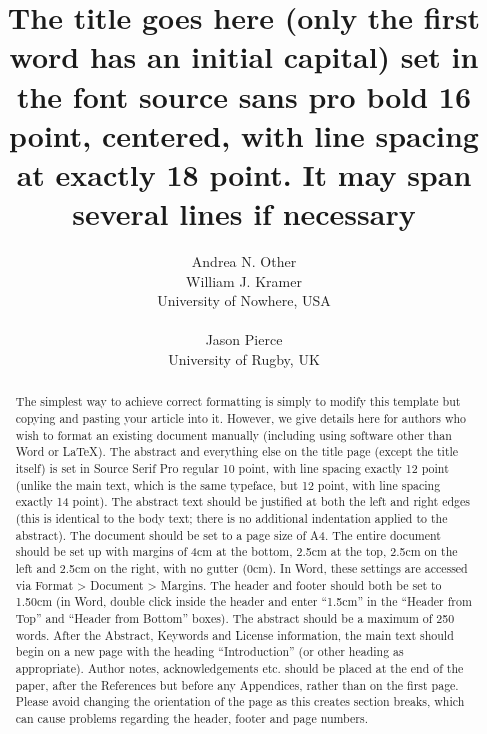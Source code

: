 \documentclass{ldr-article}
\title{The title goes here (only the first word has an initial capital) set in the font source sans pro bold 16 point, centered, with line spacing at exactly 18 point. It may span several lines if necessary}
\author{
Andrea N. Other\\
William J. Kramer\\
University of Nowhere, USA
\\\\
Jason Pierce\\
University of Rugby, UK
}
\begin{document}
    \maketitle

    \begin{abstract}
       The simplest way to achieve correct formatting is simply to modify this template but copying and pasting your article into it. However, we give details here for authors who wish to format an existing document manually (including using software other than Word or \LaTeX). The abstract and everything else on the title page (except the title itself) is set in Source Serif Pro regular 10 point, with line spacing exactly 12 point (unlike the main text, which is the same typeface, but 12 point, with line spacing exactly 14 point). The abstract text should be justified at both the left and right edges (this is identical to the body text; there is no additional indentation applied to the abstract). The document should be set to a page size of A4. The entire document should be set up with margins of 4cm at the bottom, 2.5cm at the top, 2.5cm on the left and 2.5cm on the right, with no gutter (0cm). In Word, these settings are accessed via Format > Document > Margins. The header and footer should both be set to 1.50cm (in Word, double click inside the header and enter “1.5cm” in the “Header from Top” and “Header from Bottom” boxes). The abstract should be a maximum of 250 words. After the Abstract, Keywords and License information, the main text should begin on a new page with the heading “Introduction” (or other heading as appropriate). Author notes, acknowledgements etc. should be placed at the end of the paper, after the References but before any Appendices, rather than on the first page. Please avoid changing the orientation of the page as this creates section breaks, which can cause problems regarding the header, footer and page numbers.
    \end{abstract}
    
\end{document}
